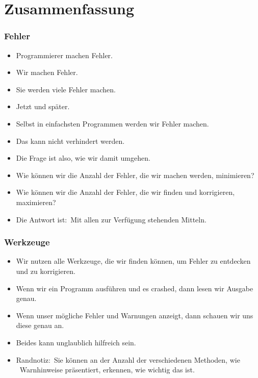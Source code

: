 \documentclass[aspectratio=169,mathserif,notheorems]{beamer}%
\begin{document}
\section{Zusammenfassung}%
%
\begin{frame}%
\frametitle{Fehler}%
\begin{itemize}%
\item Programmierer machen Fehler.%
\item<2-> Wir machen Fehler.%
\item<3-> Sie werden viele Fehler machen.%
\item<4-> Jetzt und später.%
\item<5-> Selbst in einfachsten Programmen werden wir Fehler machen.%
\item<6-> Das kann nicht verhindert werden.%
\item<7-> Die Frage ist also, wie wir damit umgehen.%
\item<8-> Wie können wir die Anzahl der Fehler, die wir machen werden, minimieren?%
\item<9-> Wie können wir die Anzahl der Fehler, die wir finden und korrigieren, maximieren?%
\item<10-> Die Antwort ist:~\alert{Mit allen zur Verfügung stehenden Mitteln}.%
\end{itemize}%
\end{frame}%
%
\begin{frame}%
\frametitle{Werkzeuge}%
\begin{itemize}%
\item Wir nutzen \alert{alle} Werkzeuge, die wir finden können, um Fehler zu entdecken und zu korrigieren.%
\item<2-> Wenn wir ein Programm ausführen und es crashed, dann lesen wir Ausgabe genau.%
\item<3-> Wenn unser  mögliche Fehler und Warnungen anzeigt, dann schauen wir uns diese genau an.%
\item<4-> Beides kann unglaublich hilfreich sein.%
\item<5-> Randnotiz:~Sie können an der Anzahl der verschiedenen Methoden, wie \pycharm\ Warnhinweise präsentiert, erkennen, wie wichtig das ist.%
\end{itemize}%
\end{frame}%
%
\end{document}
